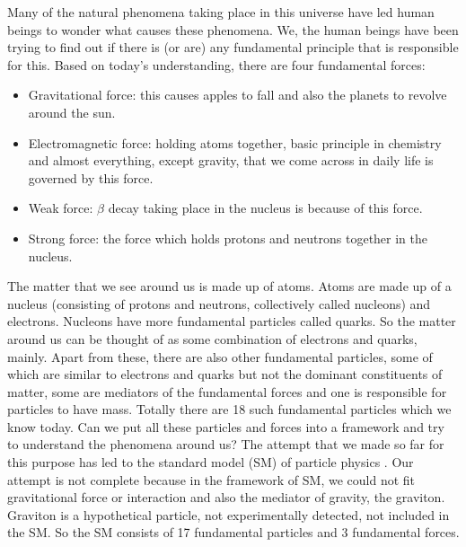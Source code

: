 Many of the natural phenomena taking place in this universe have led human beings to wonder what causes these phenomena. We, the human beings have been trying to find out if there is (or are) any fundamental principle that is responsible for this. Based on today's understanding, there are four fundamental forces:
\begin{itemize}
\item Gravitational force: this causes apples to fall and also the planets to revolve around the sun.
\item Electromagnetic force: holding atoms together, basic principle in chemistry and almost everything, except gravity, that we come across in daily life is governed by this force.
\item Weak force: $\beta$ decay taking place in the nucleus is because of this force.
\item Strong force: the force which holds protons and neutrons together in the nucleus.
\end{itemize}
The matter that we see around us is made up of atoms. Atoms are made up of a nucleus (consisting of protons and neutrons, collectively called nucleons) and electrons. Nucleons have more fundamental particles called quarks. So the matter around us can be thought of as some combination of electrons and quarks, mainly. Apart from these, there are also other fundamental particles, some of which are similar to electrons and quarks but not the dominant constituents of matter, some are mediators of the fundamental forces and one is responsible for particles to have mass. Totally there are 18 such fundamental particles which we know today. Can we put all these particles and forces into a framework and try to understand the phenomena around us? The attempt that we made so far for this purpose has led to the standard model (SM) of particle physics \cite{PhysRevLett.19.1264,RevModPhys.52.525,GLASHOW1961579}. Our attempt is not complete because in the framework of SM, we could not fit gravitational force or interaction and also the mediator of gravity, the graviton. Graviton is a hypothetical particle, not experimentally detected, not included in the SM. So the SM consists of 17 fundamental particles and 3 fundamental forces.


